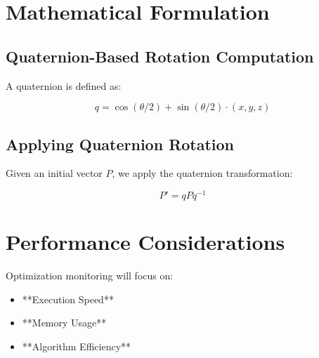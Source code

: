 \documentclass{article}
\begin{document}
\section{Mathematical Formulation}
\subsection{Quaternion-Based Rotation Computation}
A quaternion is defined as:


\[
q = \cos(\theta/2) + \sin(\theta/2) \cdot (x, y, z)
\]



\subsection{Applying Quaternion Rotation}
Given an initial vector \( P \), we apply the quaternion transformation:


\[
P' = q P q^{-1}
\]



\section{Performance Considerations}
Optimization monitoring will focus on:
\begin{itemize}
    \item **Execution Speed**
    \item **Memory Usage**
    \item **Algorithm Efficiency**
\end{itemize}
\end{document}

